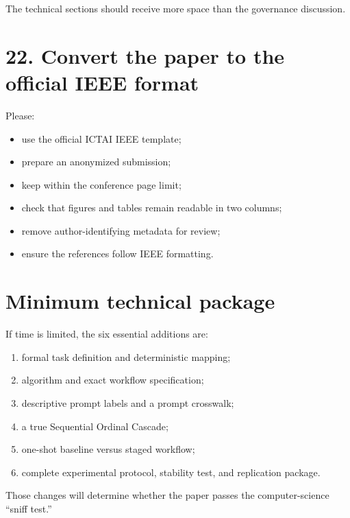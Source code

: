 \documentclass[11pt]{article}
\begin{document}
The technical sections should receive more space than the governance discussion.

\section*{22. Convert the paper to the official IEEE format}

Please:

\begin{itemize}
    \item use the official ICTAI IEEE template;
    \item prepare an anonymized submission;
    \item keep within the conference page limit;
    \item check that figures and tables remain readable in two columns;
    \item remove author-identifying metadata for review;
    \item ensure the references follow IEEE formatting.
\end{itemize}

\section*{Minimum technical package}

If time is limited, the six essential additions are:

\begin{enumerate}
    \item formal task definition and deterministic mapping;
    \item algorithm and exact workflow specification;
    \item descriptive prompt labels and a prompt crosswalk;
    \item a true Sequential Ordinal Cascade;
    \item one-shot baseline versus staged workflow;
    \item complete experimental protocol, stability test, and replication package.
\end{enumerate}

Those changes will determine whether the paper passes the computer-science ``sniff test.''
\end{document}
